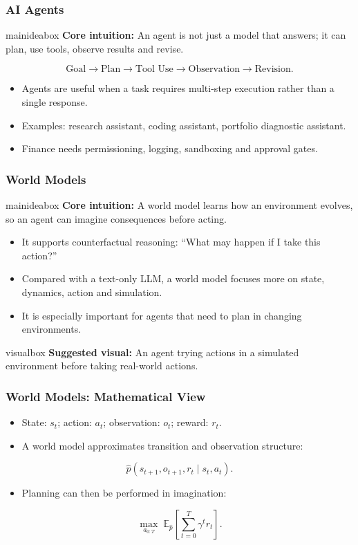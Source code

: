 \documentclass[aspectratio=169,12pt]{beamer}
\newcommand{\currentframetitle}{}
\newcommand{\slideTitle}[1]{\gdef\currentframetitle{#1}\frametitle{#1}}
\newcommand{\mainidea}[1]{%
  \vspace{0.08cm}
  \begin{beamercolorbox}[wd=\linewidth,rounded=true,sep=0.18cm]{mainideabox}
    \small\textbf{Core intuition:} #1
  \end{beamercolorbox}%
}
\newcommand{\visual}[1]{%
  \vspace{0.12cm}
  \begin{beamercolorbox}[wd=\linewidth,rounded=true,sep=0.16cm]{visualbox}
    \scriptsize\textbf{Suggested visual:} #1
  \end{beamercolorbox}%
}
\begin{document}
\begin{frame}
\slideTitle{AI Agents}
\mainidea{An agent is not just a model that answers; it can plan, use tools, observe results and revise.}
\[
\text{Goal} \rightarrow \text{Plan} \rightarrow \text{Tool Use} \rightarrow \text{Observation} \rightarrow \text{Revision}.
\]
\begin{itemize}
  \item Agents are useful when a task requires multi-step execution rather than a single response.
  \item Examples: research assistant, coding assistant, portfolio diagnostic assistant.
  \item Finance needs permissioning, logging, sandboxing and approval gates.
\end{itemize}
\end{frame}




\begin{frame}
\slideTitle{World Models}
\mainidea{A world model learns how an environment evolves, so an agent can imagine consequences before acting.}
\begin{itemize}
  \item It supports counterfactual reasoning: ``What may happen if I take this action?''
  \item Compared with a text-only LLM, a world model focuses more on state, dynamics, action and simulation.
  \item It is especially important for agents that need to plan in changing environments.
\end{itemize}
\visual{An agent trying actions in a simulated environment before taking real-world actions.}
\end{frame}



\begin{frame}
\slideTitle{World Models: Mathematical View}
\begin{itemize}
  \item State: $s_t$; action: $a_t$; observation: $o_t$; reward: $r_t$.
  \item A world model approximates transition and observation structure:
\end{itemize}
\[
    \hat{p}(s_{t+1}, o_{t+1}, r_t \mid s_t, a_t).
\]
\begin{itemize}
  \item Planning can then be performed in imagination:
\end{itemize}
\[
    \max_{a_{0:T}} \; \mathbb{E}_{\hat{p}}\left[\sum_{t=0}^T \gamma^t r_t\right].
\]
\end{frame}
\end{document}
